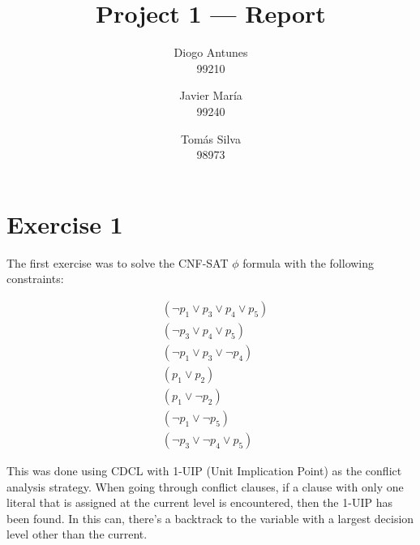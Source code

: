 \documentclass[12pt]{article}
\begin{document}
\title{Project 1 — Report}
\author{
  Diogo Antunes\\
  99210
  \and
  Javier María\\
  99240
  \and
  Tomás Silva\\
  98973
}

\maketitle

\section*{Exercise 1}

The first exercise was to solve the CNF-SAT $\phi$ formula with the following constraints:

\begin{align}
        & (\lnot p_{1} \vee p_{3} \vee p_{4} \vee p_{5}) \\
        & (\lnot p_{3} \vee p_{4} \vee p_{5}) \\
        & (\lnot p_{1} \vee p_{3} \vee \lnot p_{4}) \\
        & (p_{1} \vee p_{2}) \\
        & (p_{1} \vee \lnot p_{2}) \\
        & (\lnot p_{1} \vee \lnot p_{5}) \\
        & (\lnot p_{3} \vee \lnot p_{4} \vee p_{5})
\end{align}

\vspace{0.5cm}

This was done using CDCL with 1-UIP (Unit Implication Point) as the conflict analysis strategy.
When going through conflict clauses, if a clause with only one literal that is assigned at the current level is encountered, then the 1-UIP has been found.
In this can, there's a backtrack to the variable with a largest decision level other than the current.

\vspace{0.5cm}
\end{document}
